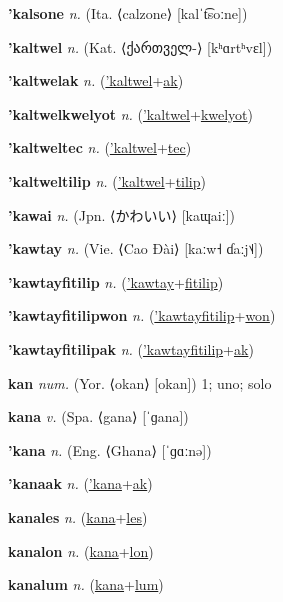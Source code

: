 \textbf{\hypertarget{'kalsone}{'kalsone}} \textit{n.} (Ita. ⟨calzone⟩ [kalˈt͡soːne])


\textbf{\hypertarget{'kaltwel}{'kaltwel}} \textit{n.} (Kat. ⟨{\georgian{}ქართველ-}⟩ [kʰɑrtʰvɛl])


\textbf{\hypertarget{'kaltwelak}{'kaltwelak}} \textit{n.} (\hyperlink{'kaltwel}{'kaltwel}+\allowbreak \hyperlink{ak}{ak})


\textbf{\hypertarget{'kaltwelkwelyot}{'kaltwelkwelyot}} \textit{n.} (\hyperlink{'kaltwel}{'kaltwel}+\allowbreak \hyperlink{kwelyot}{kwelyot})


\textbf{\hypertarget{'kaltweltec}{'kaltweltec}} \textit{n.} (\hyperlink{'kaltwel}{'kaltwel}+\allowbreak \hyperlink{tec}{tec})


\textbf{\hypertarget{'kaltweltilip}{'kaltweltilip}} \textit{n.} (\hyperlink{'kaltwel}{'kaltwel}+\allowbreak \hyperlink{tilip}{tilip})


\textbf{\hypertarget{'kawai}{'kawai}} \textit{n.} (Jpn. ⟨{\japanese{}かわいい}⟩ [kaɰaiː])


\textbf{\hypertarget{'kawtay}{'kawtay}} \textit{n.} (Vie. ⟨Cao Đài⟩ [kaːw˧ ɗaːj˦˨])


\textbf{\hypertarget{'kawtayfitilip}{'kawtayfitilip}} \textit{n.} (\hyperlink{'kawtay}{'kawtay}+\allowbreak \hyperlink{fitilip}{fitilip})


\textbf{\hypertarget{'kawtayfitilipwon}{'kawtayfitilipwon}} \textit{n.} (\hyperlink{'kawtayfitilip}{'kawtayfitilip}+\allowbreak \hyperlink{won}{won})


\textbf{\hypertarget{'kawtayfitilipak}{'kawtayfitilipak}} \textit{n.} (\hyperlink{'kawtayfitilip}{'kawtayfitilip}+\allowbreak \hyperlink{ak}{ak})


\textbf{\hypertarget{kan}{kan}} \textit{num.} (Yor. ⟨okan⟩ [okan])
1; uno; solo

\textbf{\hypertarget{kana}{kana}} \textit{v.} (Spa. ⟨gana⟩ [ˈɡana])


\textbf{\hypertarget{'kana}{'kana}} \textit{n.} (Eng. ⟨Ghana⟩ [ˈɡɑːnə])


\textbf{\hypertarget{'kanaak}{'kanaak}} \textit{n.} (\hyperlink{'kana}{'kana}+\allowbreak \hyperlink{ak}{ak})


\textbf{\hypertarget{kanales}{kanales}} \textit{n.} (\hyperlink{kana}{kana}+\allowbreak \hyperlink{les}{les})


\textbf{\hypertarget{kanalon}{kanalon}} \textit{n.} (\hyperlink{kana}{kana}+\allowbreak \hyperlink{lon}{lon})


\textbf{\hypertarget{kanalum}{kanalum}} \textit{n.} (\hyperlink{kana}{kana}+\allowbreak \hyperlink{lum}{lum})


